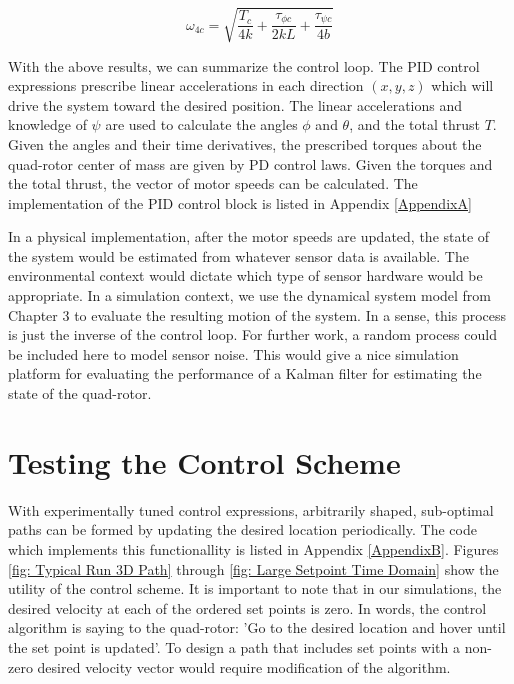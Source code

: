 \begin{equation}
    \omega_{4c} = \sqrt{ \frac{T_c}{4 k} + \frac{ \tau_{\phi c}}{2 k L}   + \frac{ \tau_{\psi c} }{4 b } }
\end{equation}


With the above results, we can summarize the control loop. The PID control expressions prescribe linear accelerations in each direction $(x,y,z)$ which will drive the system toward the desired position. The linear accelerations and knowledge of $\psi$ are used to calculate the angles $\phi$ and $\theta$, and the total thrust $T$. Given the angles and their time derivatives, the prescribed torques about the quad-rotor center of mass are given by PD control laws. Given the torques and the total thrust, the vector of motor speeds can be calculated. The implementation of the PID control block is listed in Appendix \ref{AppendixA}


In a physical implementation, after the motor speeds are updated, the state of the system would be estimated from whatever sensor data is available. The environmental context would dictate which type of sensor hardware would be appropriate. In a simulation context, we use the dynamical system model from Chapter 3 to evaluate the resulting motion of the system. In a sense, this process is just the inverse of the control loop. For further work, a random process could be included here to model sensor noise. This would give a nice simulation platform for evaluating the performance of a Kalman filter for estimating the state of the quad-rotor.

\section{Testing the Control Scheme}

With experimentally tuned control expressions, arbitrarily shaped, sub-optimal paths can be formed by updating the desired location periodically. The code which implements this functionallity is listed in Appendix \ref{AppendixB}. Figures \ref{fig: Typical Run 3D Path} through \ref{fig: Large Setpoint Time Domain} show the utility of the control scheme. It is important to note that in our simulations, the desired velocity at each of the ordered set points is zero. In words, the control algorithm is saying to the quad-rotor: 'Go to the desired location and hover until the set point is updated'. To design a path that includes set points with a non-zero desired velocity vector would require modification of the algorithm.

